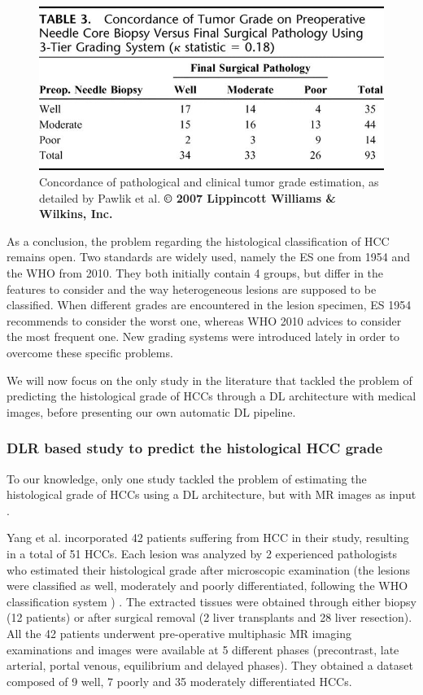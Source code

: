 \documentclass[]{article}
\begin{document}
\begin{figure}[th!]
\centering
\includegraphics[width=0.7\linewidth]{images/pawlik_table3}
\caption{Concordance of pathological and clinical tumor grade estimation, as detailed by Pawlik et al. \textbf{© 2007 Lippincott Williams \& Wilkins, Inc. \cite{Pawlik2007}}}
\label{fig:pawlik_table3}
\end{figure}


As a conclusion, the problem regarding the histological classification
of HCC remains open. Two standards are widely used, namely the ES one
from 1954 and the WHO from 2010. They both initially contain 4 groups,
but differ in the features to consider and the way heterogeneous lesions
are supposed to be classified. When different grades are encountered in
the lesion specimen, ES 1954 recommends to consider the worst one,
whereas WHO 2010 advices to consider the most frequent one. New
grading systems were introduced lately in order to overcome these
specific problems.

We will now focus on the only study in the literature that tackled the
problem of predicting the histological grade of HCCs through a DL
architecture with medical images, before presenting our own automatic DL
pipeline.

\subsubsection{DLR based study to predict the histological HCC
grade}\label{dlr-based-study-to-predict-the-histological-hcc-grade}

To our knowledge, only one study tackled the problem of estimating the
histological grade of HCCs using a DL architecture, but with MR images
as input \cite{Yang2019}.

Yang et al. incorporated 42 patients suffering from HCC in their study,
resulting in a total of 51 HCCs. Each lesion was analyzed by 2
experienced pathologists who estimated their histological grade after
microscopic examination (the lesions were classified as well, moderately
and poorly differentiated, following the WHO classification system \cite{20113051318}) .
The extracted tissues were obtained through either biopsy (12 patients)
or after surgical removal (2 liver transplants and 28 liver resection).
All the 42 patients underwent pre-operative multiphasic MR imaging
examinations and images were available at 5 different phases
(precontrast, late arterial, portal venous, equilibrium and delayed
phases). They obtained a dataset composed of 9 well, 7 poorly and 35 moderately
differentiated HCCs.
\end{document}
